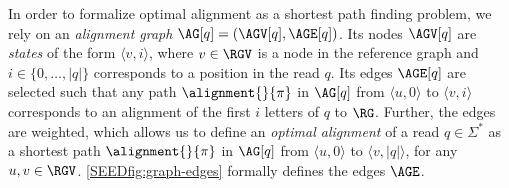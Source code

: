 %
In order to formalize optimal alignment as a shortest path finding problem, we
rely on an \emph{alignment graph} $\AG[q]=(\AGV[q],\AGE[q])$.
%
Its nodes $\AGV[q]$ are \emph{states} of the form $\langle v, i \rangle$, where
$v \in \RGV$ is a node in the reference graph and $i \in \{0, \dots, |q|\}$
corresponds to a position in the read $q$.
%
Its edges $\AGE[q]$ are selected such that any path $\alignment{}{\pi}$ in
$\AG[q]$ from $\langle u, 0 \rangle$ to $\langle v, i \rangle$ corresponds to an
alignment of the first $i$ letters of $q$ to $\RG$.
%
Further, the edges are weighted, which allows us to define an \emph{optimal
alignment} of a read $q \in \Sigma^*$ as a shortest path $\alignment{}{\pi}$ in
$\AG[q]$ from $\langle u, 0 \rangle$ to $\langle v, |q| \rangle$, for any $u, v
\in \RGV$.
%
\cref{SEEDfig:graph-edges} formally defines the edges $\AGE$.

